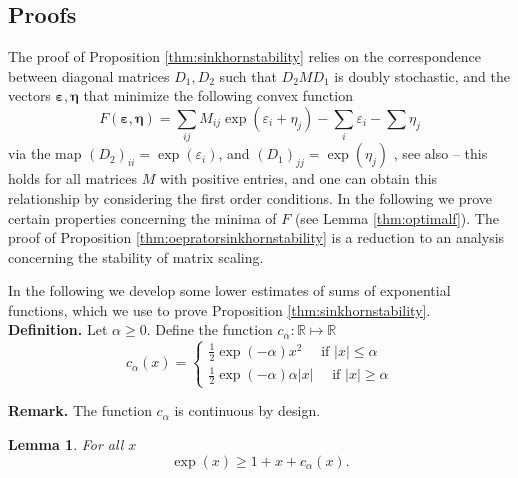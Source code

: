 \documentclass[11pt,letterpaper]{article}
\newtheorem{lemma}[theorem]{Lemma}
\begin{document}
\subsection{Proofs}

The proof of Proposition \ref{thm:sinkhornstability} relies on the correspondence between diagonal matrices $D_1, D_2$ such that $D_2 M D_1$ is doubly stochastic, and the vectors  
$\boldsymbol \varepsilon, \boldsymbol \eta$ that minimize the following convex function
\begin{equation*}
	F(\boldsymbol \varepsilon, \boldsymbol \eta) = \sum_{ij} M_{ij} \exp( \varepsilon_i + \eta_j) - \sum_i \varepsilon_i - \sum \eta_j
\end{equation*}
via the map $(D_2)_{ii} = \exp(\varepsilon_i)$, and $(D_1)_{jj} = \exp(\eta_j)$ \cite{Gor:63}, see also \cite{KhaKal:91} -- this holds for all matrices $M$ with positive entries, and one can obtain this relationship by considering the first order conditions.  In the following we prove certain properties concerning the minima of $F$ (see Lemma \ref{thm:optimalf}).  The proof of Proposition \ref{thm:oepratorsinkhornstability} is a reduction to an analysis concerning the stability of matrix scaling. 

In the following we develop some lower estimates of sums of exponential functions, which we use to prove Proposition \ref{thm:sinkhornstability}.
\\

\noindent \textbf{Definition.} Let $\alpha\geq 0$. Define the function $c_{\alpha}: \mathbb{R} \mapsto \mathbb{R}$
\begin{equation*}
	c_{\alpha} (x)= \begin{cases}
		\frac{1}{2} \exp(-\alpha) x^2 \quad \text{ if } |x| \leq \alpha \\
		\frac{1}{2} \exp(-\alpha) \alpha |x| \quad \text{ if } |x| \geq \alpha
	\end{cases}
\end{equation*}

\noindent \textbf{Remark.} The function $c_{\alpha}$ is continuous by design.

\begin{lemma}\label{thm:lowerboundonexp}
	For all $x$
	\begin{equation*}
		\exp(x) \geq 1+x+c_{\alpha} (x).
	\end{equation*}
\end{lemma}
\end{document}
